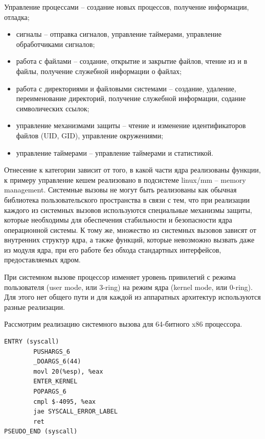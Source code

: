 \documentclass{gost7.32-2001}
\begin{document}
Управление процессами – создание новых процессов, получение
информации, отладка;
\begin{itemize}
\item
  сигналы – отправка сигналов, управление таймерами, управление
  обработчиками сигналов;
\item
  работа с файлами – создание, открытие и закрытие файлов, чтение из и
  в файлы, получение служебной информации о файлах;
\item
  работа с директориями и файловыми системами – создание, удаление,
  переименование директорий, получение служебной информации, содание
  символических ссылок;
\item
  управление механизмами защиты – чтение и изменение идентификаторов
  файлов (UID, GID), управление окружениями;
\item
  управление таймерами – управление таймерами и статистикой.
\end{itemize}


Отнесение к категории зависит от того, в какой части ядра реализованы
функции, к примеру управление кешем реализовано в подсистеме linux/mm
– memory management. Системные вызовы не могут быть реализованы как
обычная библиотека пользовательского пространства в связи с тем, что
при реализации каждого из системных вызовов используются специальные
механизмы защиты, которые необходимы для обеспечения стабильности и
безопасности ядра операционной системы. К тому же, множество из
системных вызовов зависят от внутренних структур ядра, а также
функций, которые невозможно вызвать даже из модуля ядра, при его
работе без обхода стандартных интерфейсов, предоставляемых ядром.

При системном вызове процессор изменяет уровень привилегий с режима
пользователя (user mode, или 3-ring) на режим ядра (kernel mode, или
0-ring). Для этого нет общего пути и для каждой из аппаратных
архитектур используются разные реализации.

Рассмотрим реализацию системного вызова для 64-битного x86 процессора.

\begin{lstlisting}[caption={Реализация системного вызова в glibc},
    captionpos=b, float, label={lst:glibc}]
ENTRY (syscall)
        PUSHARGS_6
        _DOARGS_6(44)
        movl 20(%esp), %eax
        ENTER_KERNEL
        POPARGS_6
        cmpl $-4095, %eax
        jae SYSCALL_ERROR_LABEL
        ret
PSEUDO_END (syscall)
\end{lstlisting}
\end{document}
